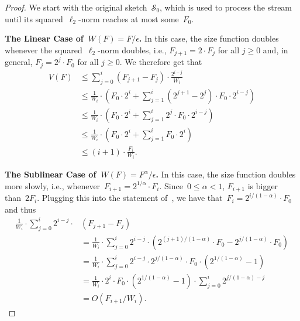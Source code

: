 \documentclass[sigconf]{acmart}
\newcommand{\parentheses}[1]{\left(#1\right)}
\begin{document}
\begin{proof}
    We start with the original sketch~$\mathcal{S}_0$, which is used to process
    the stream until its squared~$\ell_2${\nobreakdash-}norm reaches at most
    some~$F_0$.

    \textbf{The Linear Case of~$W(F)=F/\epsilon$.}
    In this case, the size function doubles whenever the
    squared~$\ell_2${\nobreakdash-}norm doubles, i.e., $F_{j+1} = 2
    \cdot F_j$ for all $j\geq 0$ and, in general, $F_j = 2^j \cdot F_0$ for all
    $j\geq 0$. We therefore get that
    \begin{align*}
        V(F) &\leq  \sum_{j=0}^{i}  \parentheses{F_{j+1} - F_j} \cdot \frac{2^{i-j}}{W_i} \\
        & \leq \frac{1}{W_i} \cdot \parentheses{ F_0 \cdot 2^{i} + \sum_{j=1}^{i}  \parentheses{2^{j+1} - 2^j} \cdot F_0 \cdot 2^{i-j}} \\
        & \leq \frac{1}{W_i} \cdot  \parentheses{ F_0 \cdot 2^{i} +  \sum_{j=1}^{i}  2^j \cdot F_0 \cdot 2^{i-j}} \\
        & \leq \frac{1}{W_i} \cdot  \parentheses{ F_0 \cdot 2^{i} +  \sum_{j=1}^{i}  F_0 \cdot 2^i} \\
        & \leq (i+1) \cdot \frac{F_i}{W_i}.
    \end{align*}

\medskip\noindent
\textbf{The Sublinear Case of~$W(F)=F^{\alpha}/\epsilon$.}
    In this case, the size function doubles more slowly, i.e.,
    whenever~$F_{i+1} = 2^{1/\alpha} \cdot F_i$. Since~$0 \leq \alpha < 1$,
    $F_{i+1}$ is bigger than~$2F_i$. Plugging this into the statement
    of~, we have that~$F_i = 2^{i/(1-\alpha)} \cdot F_0$ and
    thus
    \begin{align*}
        \frac{1}{W_i} \cdot \sum_{j=0}^i  2^{i-j} \cdot & (F_{j+1} - F_j) \\
        & = \frac{1}{W_i} \cdot \sum_{j=0}^i  2^{i-j} \cdot \parentheses{2^{(j+1)/(1-\alpha)}\cdot F_0 - 2^{j/(1-\alpha)} \cdot F_0} \\
        & = \frac{1}{W_i} \cdot \sum_{j=0}^i  2^{i-j} \cdot 2^{j/(1-\alpha)} \cdot F_0 \cdot \parentheses{2^{1/(1-\alpha)}-1} \\
        & = \frac{1}{W_i} \cdot 2^i \cdot F_0 \cdot \parentheses{2^{1/(1-\alpha)}-1} \cdot \sum_{j=0}^i 2^{j/(1-\alpha) - j} \\
        & = O(F_{i+1}/W_i).
    \end{align*}	
\end{proof}
\end{document}
